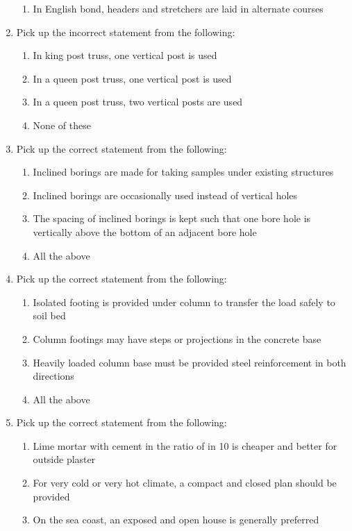 \documentclass[11pt,a4paper]{article}
\begin{document}
\begin{enumerate}
\begin{enumerate}[label=\Alph*.]
\item{In English bond, headers and stretchers are laid in alternate courses}
\end{enumerate}
\item{Pick up the incorrect statement from the following:}
\begin{enumerate}[label=\Alph*.]
\item{In king post truss, one vertical post is used}
\item{In a queen post truss, one vertical post is used}
\item{In a queen post truss, two vertical posts are used}
\item{None of these}
\end{enumerate}
\item{Pick up the correct statement from the following:}
\begin{enumerate}[label=\Alph*.]
\item{Inclined borings are made for taking samples under existing structures}
\item{Inclined borings are occasionally used instead of vertical holes}
\item{The spacing of inclined borings is kept such that one bore hole is vertically above the bottom of an adjacent bore hole}
\item{All the above}
\end{enumerate}
\item{Pick up the correct statement from the following:}
\begin{enumerate}[label=\Alph*.]
\item{Isolated footing is provided under column to transfer the load safely to soil bed}
\item{Column footings may have steps or projections in the concrete base}
\item{Heavily loaded column base must be provided steel reinforcement in both directions}
\item{All the above}
\end{enumerate}
\item{Pick up the correct statement from the following:}
\begin{enumerate}[label=\Alph*.]
\item{Lime mortar with cement in the ratio of in 10 is cheaper and better for outside plaster}
\item{For very cold or very hot climate, a compact and closed plan should be provided}
\item{On the sea coast, an exposed and open house is generally preferred}

\end{enumerate}
\end{enumerate}
\end{document}

